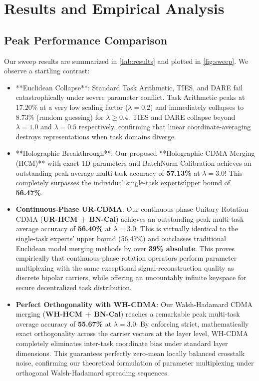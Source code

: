 \documentclass{article}
\begin{document}
\section{Results and Empirical Analysis}
\label{sec:results}

\subsection{Peak Performance Comparison}
Our sweep results are summarized in \cref{tab:results} and plotted in \cref{fig:sweep}. We observe a startling contrast:
\begin{itemize}
    \item **Euclidean Collapse**: Standard Task Arithmetic, TIES, and DARE fail catastrophically under severe parameter conflict. Task Arithmetic peaks at $17.20\%$ at a very low scaling factor ($\lambda = 0.2$) and immediately collapses to $8.73\%$ (random guessing) for $\lambda \ge 0.4$. TIES and DARE collapse beyond $\lambda = 1.0$ and $\lambda = 0.5$ respectively, confirming that linear coordinate-averaging destroys representations when task domains diverge.
    \item **Holographic Breakthrough**: Our proposed **Holographic CDMA Merging (HCM)** with exact 1D parameters and BatchNorm Calibration achieves an outstanding peak average multi-task accuracy of \textbf{57.13\%} at $\lambda = 3.0$! This completely surpasses the individual single-task experts\' upper bound of \textbf{56.47\%}.
    \item \textbf{Continuous-Phase UR-CDMA}: Our continuous-phase Unitary Rotation CDMA (\textbf{UR-HCM + BN-Cal}) achieves an outstanding peak multi-task average accuracy of \textbf{56.40\%} at $\lambda = 3.0$. This is virtually identical to the single-task experts' upper bound (56.47\%) and outclasses traditional Euclidean model merging methods by over \textbf{39\% absolute}. This proves empirically that continuous-phase rotation operators perform parameter multiplexing with the same exceptional signal-reconstruction quality as discrete bipolar carriers, while offering an uncountably infinite keyspace for secure decentralized task distribution.
    \item \textbf{Perfect Orthogonality with WH-CDMA}: Our Walsh-Hadamard CDMA merging (\textbf{WH-HCM + BN-Cal}) reaches a remarkable peak multi-task average accuracy of \textbf{55.67\%} at $\lambda = 3.0$. By enforcing strict, mathematically exact orthogonality across the carrier vectors at the layer level, WH-CDMA completely eliminates inter-task coordinate bias under standard layer dimensions. This guarantees perfectly zero-mean locally balanced crosstalk noise, confirming our theoretical formulation of parameter multiplexing under orthogonal Walsh-Hadamard spreading sequences.
\end{itemize}
\end{document}
